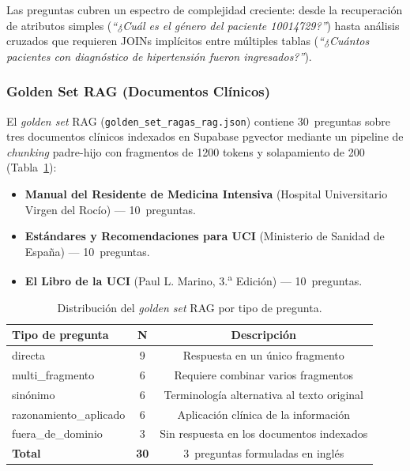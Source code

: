 Las preguntas cubren un espectro de complejidad creciente: desde la recuperación de atributos simples (\textit{``¿Cuál es el género del paciente 10014729?''}) hasta análisis cruzados que requieren JOINs implícitos entre múltiples tablas (\textit{``¿Cuántos pacientes con diagnóstico de hipertensión fueron ingresados?''}).

\subsubsection{Golden Set \ac{RAG} (Documentos Clínicos)}

El \textit{golden set} \ac{RAG} (\texttt{golden\_set\_ragas\_rag.json}) contiene 30~preguntas sobre tres documentos clínicos indexados en Supabase pgvector mediante un pipeline de \textit{chunking} padre-hijo con fragmentos de 1200 tokens y solapamiento de 200 (Tabla~\ref{tab:golden_set_rag}):

\begin{itemize}[nosep, leftmargin=*]
  \item \textbf{Manual del Residente de Medicina Intensiva} (Hospital Universitario Virgen del Rocío) --- 10~preguntas.
  \item \textbf{Estándares y Recomendaciones para UCI} (Ministerio de Sanidad de España) --- 10~preguntas.
  \item \textbf{El Libro de la UCI} (Paul L. Marino, 3.\textsuperscript{a} Edición) --- 10~preguntas.
\end{itemize}

\begin{table}[H]
\centering
\caption{Distribución del \textit{golden set} \acs{RAG} por tipo de pregunta.}
\label{tab:golden_set_rag}
\footnotesize
\begin{tabularx}{\columnwidth}{lcc}
\toprule
\textbf{Tipo de pregunta} & \textbf{N} & \textbf{Descripción} \\
\midrule
directa              & 9 & Respuesta en un único fragmento \\
multi\_fragmento     & 6 & Requiere combinar varios fragmentos \\
sinónimo             & 6 & Terminología alternativa al texto original \\
razonamiento\_aplicado & 6 & Aplicación clínica de la información \\
fuera\_de\_dominio   & 3 & Sin respuesta en los documentos indexados \\
\midrule
\textbf{Total} & \textbf{30} & 3~preguntas formuladas en inglés \\
\bottomrule
\end{tabularx}
\end{table}


